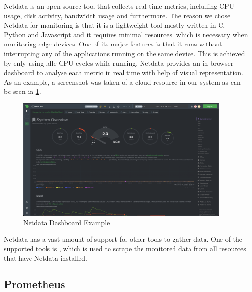       Netdata \cite{netdataGettingStartedLearn2023} is an open-source tool that collects real-time metrics, including CPU usage, disk activity, bandwidth usage and furthermore.
      The reason we chose Netdata for monitoring is that it is a lightweight tool mostly written in C, Python and Javascript and it requires minimal resources, which is necessary when monitoring edge devices.
      One of its major features is that it runs without interrupting any of the applications running on the same device. This is achieved by only using idle CPU cycles while running.
      Netdata provides an in-browser dashboard to analyse each metric in real time with help of visual representation. As an example, a screenshot was taken of a cloud resource in our system as can be seen in \ref{fig:netdata-dashboard}.
      \begin{figure}[h!]
          \centering
          \includegraphics[width=0.95\textwidth]{figures/netdata.png}
          \caption{Netdata Dashboard Example}
          \label{fig:netdata-dashboard}
      \end{figure}
      Netdata has a vast amount of support for other tools to gather data. 
      One of the supported tools is , which is used to scrape the monitored data from all resources that have Netdata installed. 

    \subsection{Prometheus}
    \label{sec:prometheus-third-party}
    
